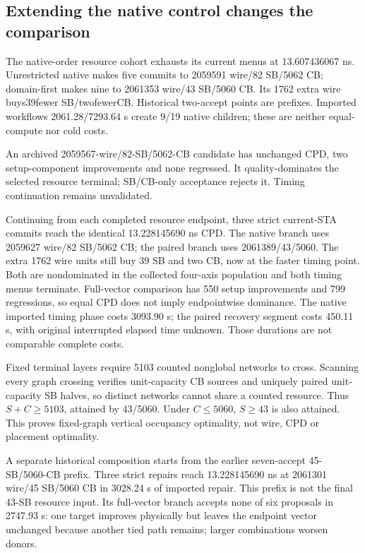 \documentclass[conference,10pt]{IEEEtran}
\begin{document}
\subsection{Extending the native control changes the comparison}
The native-order resource cohort exhausts its current menus at 13.607436067 ns. Unrestricted native makes five commits to 2059591 wire/82 SB/5062 CB; domain-first makes nine to 2061353 wire/43 SB/5060 CB. Its 1762 extra wire buys39fewer SB/twofewerCB. Historical two-accept points are prefixes. Imported workflows 2061.28/7293.64 s create 9/19 native children; these are neither equal-compute nor cold costs.

An archived 2059567-wire/82-SB/5062-CB candidate has unchanged CPD, two setup-component improvements and none regressed. It quality-dominates the selected resource terminal; SB/CB-only acceptance rejects it. Timing continuation remains unvalidated.

Continuing from each completed resource endpoint, three strict current-STA commits reach the identical 13.228145690 ns CPD. The native branch uses 2059627 wire/82 SB/5062 CB; the paired branch uses 2061389/43/5060. The extra 1762 wire units still buy 39 SB and two CB, now at the faster timing point. Both are nondominated in the collected four-axis population and both timing menus terminate. Full-vector comparison has 550 setup improvements and 799 regressions, so equal CPD does not imply endpointwise dominance. The native imported timing phase costs 3093.90 s; the paired recovery segment costs 450.11 s, with original interrupted elapsed time unknown. Those durations are not comparable complete costs.

Fixed terminal layers require 5103 counted nonglobal networks to cross. Scanning every graph crossing verifies unit-capacity CB sources and uniquely paired unit-capacity SB halves, so distinct networks cannot share a counted resource. Thus $S+C\ge5103$, attained by 43/5060. Under $C\le5060$, $S\ge43$ is also attained. This proves fixed-graph vertical occupancy optimality, not wire, CPD or placement optimality.

A separate historical composition starts from the earlier seven-accept 45-SB/5060-CB prefix. Three strict repairs reach 13.228145690 ns at 2061301 wire/45 SB/5060 CB in 3028.24 s of imported repair. This prefix is not the final 43-SB resource input. Its full-vector branch accepts none of six proposals in 2747.93 s: one target improves physically but leaves the endpoint vector unchanged because another tied path remains; larger combinations worsen donors.
\end{document}
